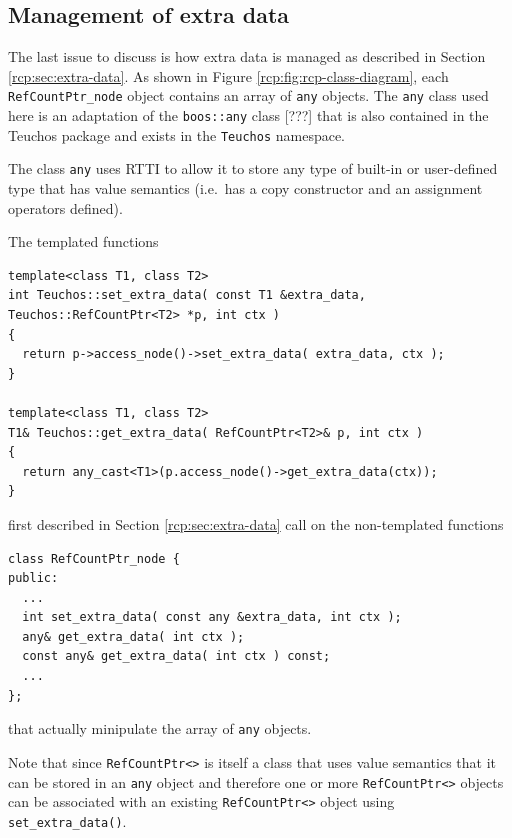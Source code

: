 %
\subsection{Management of extra data}
%

The last issue to discuss is how extra data is managed as described in
Section {}\ref{rcp:sec:extra-data}.  As shown in Figure
{}\ref{rcp:fig:rcp-class-diagram}, each
{}\texttt{Ref\-Count\-Ptr\-\_node} object contains an array of
{}\texttt{any} objects.  The {}\texttt{any} class used here is an
adaptation of the {}\texttt{boos\-::any} class [???] that is also
contained in the Teuchos package and exists in the {}\texttt{Teuchos}
namespace.

The class {}\texttt{any} uses RTTI to allow it to store any type of
built-in or user-defined type that has value semantics (i.e.~has a
copy constructor and an assignment operators defined).

The templated functions
%
{\scriptsize\begin{verbatim}
template<class T1, class T2>
int Teuchos::set_extra_data( const T1 &extra_data, Teuchos::RefCountPtr<T2> *p, int ctx )
{
  return p->access_node()->set_extra_data( extra_data, ctx );
}

template<class T1, class T2>
T1& Teuchos::get_extra_data( RefCountPtr<T2>& p, int ctx )
{
  return any_cast<T1>(p.access_node()->get_extra_data(ctx));
}
\end{verbatim}}
%
{}\noindent{}first described in Section {}\ref{rcp:sec:extra-data}
call on the non-templated functions
%
{\scriptsize\begin{verbatim}
class RefCountPtr_node {
public:
  ...
  int set_extra_data( const any &extra_data, int ctx );
  any& get_extra_data( int ctx );
  const any& get_extra_data( int ctx ) const;
  ...
};
\end{verbatim}}
%
{}\noindent{}that actually minipulate the array of {}\texttt{any}
objects.

Note that since {}\texttt{Ref\-Count\-Ptr<>} is itself a class that
uses value semantics that it can be stored in an {}\texttt{any} object
and therefore one or more {}\texttt{Ref\-Count\-Ptr<>} objects can be
associated with an existing {}\texttt{Ref\-Count\-Ptr<>} object using
{}\texttt{set\-\_extra\-\_data()}.
